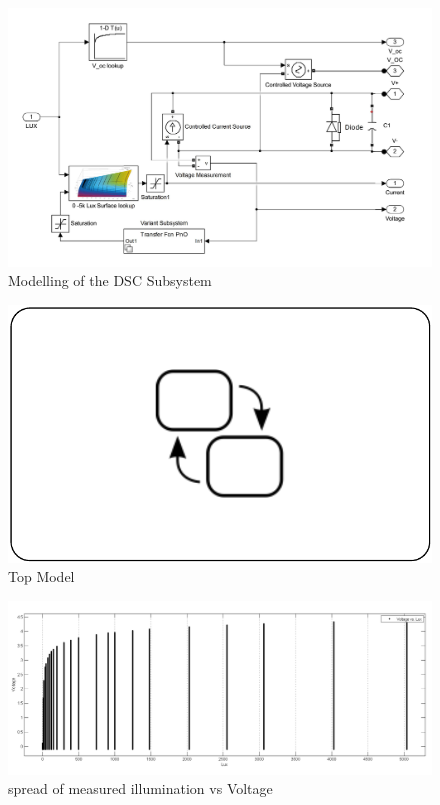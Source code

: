 \begin{figure}[H]
  \begin{center}
  \includegraphics[width=\textwidth]{images/PV_block_Model}
  \caption{Modelling of the DSC Subsystem }
  \label{fig:PV_block_Model}
  \end{center}
  \end{figure}

\begin{figure}[H]
  \begin{center}
 \includegraphics[width=\textwidth]{images/IC_stateflow}
  \caption{Top Model }
  \label{fig:Model_top}
  \end{center}
  \end{figure}

 \begin{figure}[H]
  \begin{center}
	\includegraphics[width=\linewidth]{images/Voltagevlux}
	\caption{spread of measured illumination vs Voltage  }
	\label{fig:Voltagevlux}
  \end{center}
 \end{figure}
 
